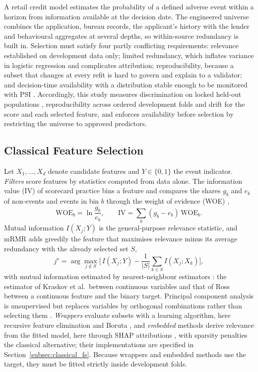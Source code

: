 \documentclass[final,5p,twocolumn]{elsarticle}
\begin{document}
A retail credit model estimates the probability of a defined adverse event within a horizon from information available at the decision date. The engineered universe combines the application, bureau records, the applicant's history with the lender and behavioural aggregates at several depths, so within-source redundancy is built in. Selection must satisfy four partly conflicting requirements: relevance established on development data only; limited redundancy, which inflates variance in logistic regression and complicates attribution; reproducibility, because a subset that changes at every refit is hard to govern and explain to a validator; and decision-time availability with a distribution stable enough to be monitored with PSI \cite{siddiqi2006,thomas2002,yurdakul2020}. Accordingly, this study measures discrimination on locked held-out populations \cite{bergmeir2012}, reproducibility across ordered development folds and drift for the score and each selected feature, and enforces availability before selection by restricting the universe to approved predictors.

\subsection{Classical Feature Selection}
\label{subsec:classical_fs_background}

Let $X_1,\dots,X_d$ denote candidate features and $Y\in\{0,1\}$ the event indicator. \emph{Filters} score features by statistics computed from data alone. The information value (IV) of scorecard practice bins a feature and compares the shares $g_b$ and $e_b$ of non-events and events in bin $b$ through the weight of evidence (WOE) \cite{siddiqi2006},
\begin{equation}
    \mathrm{WOE}_b=\ln\frac{g_b}{e_b},\qquad
    \mathrm{IV}=\sum_{b}(g_b-e_b)\,\mathrm{WOE}_b .
    \label{eq:iv}
\end{equation}
Mutual information $I(X_j;Y)$ is the general-purpose relevance statistic, and mRMR \cite{peng2005} adds greedily the feature that maximises relevance minus its average redundancy with the already selected set $S$,
\begin{equation}
    j^{\star}=\arg\max_{j\notin S}\Big[\,I(X_j;Y)-\frac{1}{|S|}\sum_{k\in S} I(X_j;X_k)\Big],
    \label{eq:mrmr}
\end{equation}
with mutual information estimated by nearest-neighbour estimators \cite{kraskov2004,ross2014}: the estimator of Kraskov et al.\ between continuous variables and that of Ross between a continuous feature and the binary target. Principal component analysis is unsupervised but replaces variables by orthogonal combinations rather than selecting them \cite{jolliffe2016}. \emph{Wrappers} evaluate subsets with a learning algorithm, here recursive feature elimination \cite{guyon2002} and Boruta \cite{kursa2010,breiman2001}, and \emph{embedded} methods derive relevance from the fitted model, here through SHAP attributions \cite{lundberg2017}, with sparsity penalties \cite{tibshirani1996} the classical alternative; their implementations are specified in Section~\ref{subsec:classical_fs}. Because wrappers and embedded methods use the target, they must be fitted strictly inside development folds.
\end{document}
